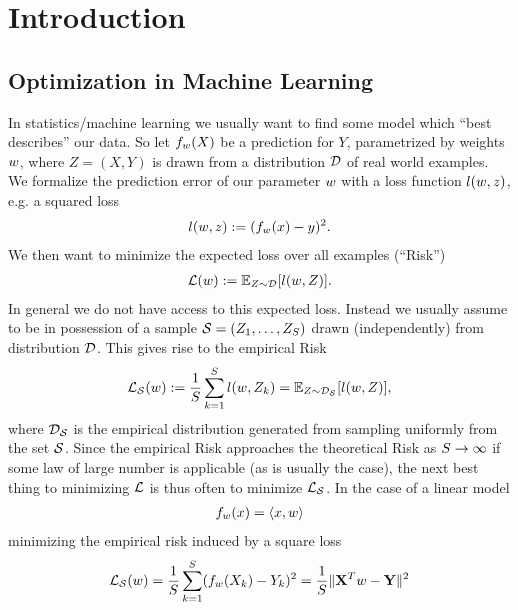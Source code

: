 
\chapter{Introduction}

\section{Optimization in Machine Learning}

In statistics/machine learning we usually want to find some model
which ``best describes'' our data. So let \(f_{w}(X)\) be a prediction for
\(Y\), parametrized by weights \(w\), where \(Z=(X,Y)\) is drawn from a
distribution \(\mathcal{D}\) of real world examples. We formalize the prediction error
of our parameter \(w\) with a loss function \(l(w, z)\), e.g. 
a squared loss
%
\begin{align*}
	l(w, z) := (f_{w}(x) - y)^2.
\end{align*}
%
We then want to minimize the expected loss over all examples (``Risk'')
%
\begin{align*}
	\mathcal{L}(w) := \mathbb{E}_{Z\sim \mathcal{D}} [l(w, Z)].
\end{align*}
In general we do not have access to this expected loss. Instead we usually
assume to be in possession of a sample \(\mathcal{S}=(Z_1, \dots, Z_{S})\) drawn
(independently) from distribution \(\mathcal{D}\). This gives rise to the empirical
Risk
\begin{align*}
	\mathcal{L}_{\mathcal{S}}(w)
	:= \frac{1}{S}\sum_{k=1}^S l(w, Z_k)
	= \mathbb{E}_{Z\sim \mathcal{D}_{\mathcal{S}}}[l(w, Z)],
\end{align*}
where \(\mathcal{D}_{\mathcal{S}}\) is the empirical distribution generated from sampling
uniformly from the set \(\mathcal{S}\). Since the empirical Risk approaches the
theoretical Risk as \(S\to\infty\) if some law of large number is
applicable (as is usually the case), the next best thing to minimizing \(\mathcal{L}\)
is thus often to minimize \(\mathcal{L}_{\mathcal{S}}\). In the case of a linear model
\begin{align*}
	f_{w}(x) = \langle x, w \rangle
\end{align*}
minimizing the empirical risk induced by a square loss
\begin{align*}
	\mathcal{L}_{\mathcal{S}}(w)
	= \frac{1}{S}\sum_{k=1}^S (f_{w}(X_k)-Y_k)^2
	= \frac{1}{S}\| \mathbf{X}^Tw - \mathbf{Y}\|^2
\end{align*}
